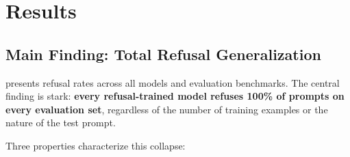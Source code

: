 \section{Results}
\label{sec:results}

\subsection{Main Finding: Total Refusal Generalization}
\label{sec:results-main}

 presents refusal rates across all models and evaluation benchmarks. The central finding is stark: \textbf{every refusal-trained model refuses 100\% of prompts on every evaluation set}, regardless of the number of training examples or the nature of the test prompt.

\begin{table}[t]
    \centering
    \caption{Refusal rates (\%) across models and evaluation benchmarks. All refusal-trained models (N=10 through N=500) exhibit 100\% refusal on every benchmark. The control model, fine-tuned on the same instructions with helpful responses, shows no such collapse. Best results for each column are in \textbf{bold} (lower is better for benign/borderline/tricky; higher is better for harmful).}
    \label{tab:main}
\end{table}

Three properties characterize this collapse:

